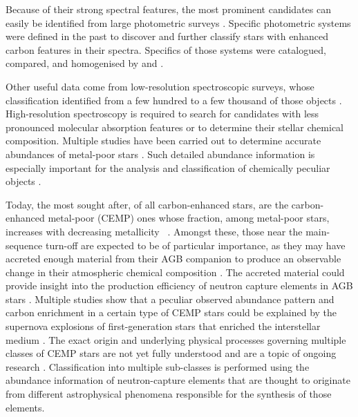 Because of their strong spectral features, the most prominent candidates can easily be identified from large photometric surveys \citep{2002AJ....124.1651M, 2004AJ....127.2838D}. Specific photometric systems \citep{1960MNRAS.120..287G, 1968AJ.....73..313M, 1970A&AS....1..199H} were defined in the past to discover and further classify stars with enhanced carbon features in their spectra. Specifics of those systems were catalogued, compared, and homogenised by \citet{2000A&AS..147..361M} and \citet{2003A&A...401..781F}.

Other useful data come from low-resolution spectroscopic surveys, whose classification identified from a few hundred to a few thousand of those objects \citep{2001A&A...375..366C, 2013ApJ...765...12G, 2013AJ....146..132L, 2016ApJS..226....1J, 2018ApJS..234...31L}. High-resolution spectroscopy is required to search for candidates with less pronounced molecular absorption features or to determine their stellar chemical composition. Multiple studies have been carried out to determine accurate abundances of metal-poor stars \citep{1997ApJ...488..350N, 2002ApJ...567.1166A, 2004A&A...416.1117C, 2005ESASP.560..433B, 2006AJ....132..137C, 2007ApJ...655..492A, 2007ApJ...670..774N, 2011ApJ...742...54H, 2013ApJ...762...26Y, 2014AJ....147..136R, 2015ApJ...807..173H, 2015ApJ...807..171J}. Such detailed abundance information is especially important for the analysis and classification of chemically peculiar objects \citep{2013ApJ...778...56C}.

Today, the most sought after, of all carbon-enhanced stars, are the carbon-enhanced metal-poor (CEMP) ones whose fraction, among metal-poor stars, increases with decreasing metallicity \Meh\ \citep{1992AJ....103.1987B, 1997ApJ...488..350N, 1999ASPC..165..264R, 2005ApJ...633L.109C, 2005ApJ...625..825L, 2005AJ....130.2804R, 2006ApJ...652.1585F, 2007PhDT........22M, 2012ApJ...744..195C, 2013AJ....146..132L, 2013ApJ...762...27Y,  2014ApJ...797...21P, 2018ApJ...861..146Y}. Amongst these, those near the main-sequence turn-off are expected to be of particular importance, as they may have accreted enough material from their AGB companion to produce an observable change in their atmospheric chemical composition \citep{2004ApJ...611..476S, 2014MNRAS.441.1217S, 2015ApJ...807..173H}. The accreted material could provide insight into the production efficiency of neutron capture elements in AGB stars \citep{2007ApJ...655..492A}. Multiple studies show that a peculiar observed abundance pattern and carbon enrichment in a certain type of CEMP stars could be explained by the supernova explosions of first-generation stars that enriched the interstellar medium \citep{2003Natur.422..871U, 2005ApJ...619..427U, 2014ApJ...785...98T, 2018MNRAS.tmp.2127B}. The exact origin and underlying physical processes governing multiple classes of CEMP stars are not yet fully understood and are a topic of ongoing research \citep{2014ApJ...788..180C, 2016ApJ...833...20Y, 2018MNRAS.475.4781C}. Classification into multiple sub-classes is performed using the abundance information of neutron-capture elements \citep{2005ARA&A..43..531B, 2013A&A...552A.107S, 2015ApJ...814..121H, 2016ApJ...833...20Y} that are thought to originate from different astrophysical phenomena responsible for the synthesis of those elements.

